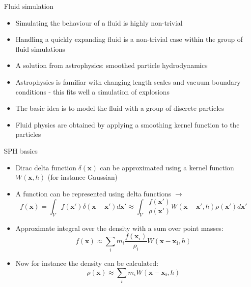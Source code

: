 \documentclass{beamer}
\begin{document}
\begin{frame}{Fluid simulation}
\begin{itemize}

\item Simulating the behaviour of a fluid is highly non-trivial
\item Handling a quickly expanding fluid is a non-trivial case within the group of fluid simulations
\item A solution from astrophysics: smoothed particle hydrodynamics
\item Astrophysics is familiar with changing length scales and vacuum boundary conditions - this fits well a simulation of explosions
\item The basic idea is to model the fluid with a group of discrete particles
\item Fluid physics are obtained by applying a smoothing kernel function to the particles

\end{itemize}
\end{frame}

\begin{frame}{SPH basics}
\begin{itemize}

\item Dirac delta function $\delta (\mathbf{x})$ can be approximated using  a kernel function $W(\mathbf{x},h)$ (for instance Gaussian)
\item A function can be represented using delta functions $\rightarrow$
\begin{equation}
 f(\mathbf{x}) = \int_V f(\mathbf{x}') \delta (\mathbf{x}-\mathbf{x}') d\mathbf{x}' \approx \int_V \frac{f(\mathbf{x}')}{\rho(\mathbf{x}')} W(\mathbf{x}-\mathbf{x}',h) \rho(\mathbf{x}') d\mathbf{x}' 
\end{equation}
\item Approximate integral over the density with a sum over point masses:
\begin{equation}
 f(\mathbf{x}) \approx \sum_i m_i \frac{f(\mathbf{x}_i)}{\rho_i} W( \mathbf{x} - \mathbf{x_i}, h )
\end{equation}
\item Now for instance the density can be calculated:
\begin{equation}
\rho(\mathbf{x}) \approx \sum_i m_i W( \mathbf{x} - \mathbf{x_i}, h )
\end{equation}

\end{itemize}
\end{frame}
\end{document}

